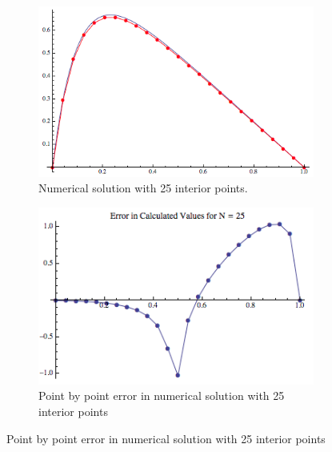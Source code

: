 \documentclass{article}
\begin{document}
\begin{figure}[H]
	\begin{subfigure}{.5\textwidth}
  		\centering
  		\includegraphics[width=.9\linewidth]{solutionN25}
  		\caption{Numerical solution with 25 interior points. \label{fig: }}
	\end{subfigure}%
	\begin{subfigure}{.5\textwidth}
  		\centering
  		\includegraphics[width=.9\linewidth]{solutionErrorN25}
  		\caption{Point by point error in numerical solution with 25 interior points \label{fig: }}
	\end{subfigure}

\end{figure}
	
\end{document}
